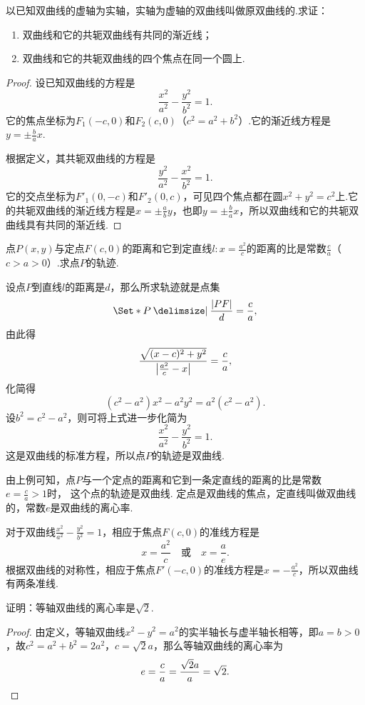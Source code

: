 \begin{example}
以已知双曲线的虚轴为实轴，实轴为虚轴的双曲线叫做原双曲线的.求证：\begin{enumerate}
\item 双曲线和它的共轭双曲线有共同的渐近线；
\item 双曲线和它的共轭双曲线的四个焦点在同一个圆上.
\end{enumerate}
\begin{proof}
设已知双曲线的方程是\[
\frac{x^2}{a^2}-\frac{y^2}{b^2}=1.
\]它的焦点坐标为\(F_1(-c,0)\)和\(F_2(c,0)\)（\(c^2=a^2+b^2\)）.它的渐近线方程是\(y=\pm\frac{b}{a}x\).

根据定义，其共轭双曲线的方程是\[
\frac{y^2}{a^2}-\frac{x^2}{b^2}=1.
\]它的交点坐标为\(F'_1(0,-c)\)和\(F'_2(0,c)\)，可见四个焦点都在圆\(x^2+y^2=c^2\)上.它的共轭双曲线的渐近线方程是\(x=\pm\frac{a}{b}y\)，也即\(y=\pm\frac{b}{a}x\)，所以双曲线和它的共轭双曲线具有共同的渐近线.
\end{proof}
\end{example}

\begin{example}
点\(P(x,y)\)与定点\(F(c,0)\)的距离和它到定直线\(l: x = \frac{a^2}{c}\)的距离的比是常数\(\frac{c}{a}\)（\(c > a > 0\)）.求点\(P\)的轨迹.
\begin{solution}
设点\(P\)到直线\(l\)的距离是\(d\)，那么所求轨迹就是点集\[
\Set*{ P \given \frac{\abs{PF}}{d} = \frac{c}{a} },
\]由此得\[
\frac{\sqrt{(x-c)^2+y^2}}{\abs{\frac{a^2}{c}-x}} = \frac{c}{a},
\]化简得\[
(c^2-a^2)x^2 - a^2 y^2 = a^2(c^2-a^2).
\]设\(b^2=c^2-a^2\)，则可将上式进一步化简为\[
\frac{x^2}{a^2}-\frac{y^2}{b^2}=1.
\]这是双曲线的标准方程，所以点\(P\)的轨迹是双曲线.
\end{solution}

由上例可知，点\(P\)与一个定点的距离和它到一条定直线的距离的比是常数
\(e = \frac{c}{a} > 1\)时，
这个点的轨迹是双曲线.
定点是双曲线的焦点，定直线叫做双曲线的，常数\(e\)是双曲线的离心率.

对于双曲线\(\frac{x^2}{a^2}-\frac{y^2}{b^2}=1\)，相应于焦点\(F(c,0)\)的准线方程是\[
x = \frac{a^2}{c}
\quad\text{或}\quad
x = \frac{a}{e}.
\]根据双曲线的对称性，相应于焦点\(F'(-c,0)\)的准线方程是\(x=-\frac{a^2}{c}\)，所以双曲线有两条准线.
\end{example}

\begin{example}
证明：等轴双曲线的离心率是\(\sqrt2\).
\begin{proof}
由定义，等轴双曲线\(x^2-y^2=a^2\)的实半轴长与虚半轴长相等，即\(a=b>0\)，故\(c^2 = a^2 + b^2 = 2 a^2\)，\(c = \sqrt2 a\)，那么等轴双曲线的离心率为\[
e = \frac{c}{a} = \frac{\sqrt2 a}{a} = \sqrt2.
\qedhere
\]
\end{proof}
\end{example}

